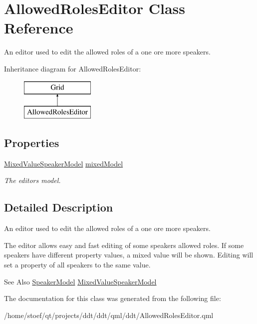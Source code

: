\hypertarget{classAllowedRolesEditor}{\section{Allowed\-Roles\-Editor Class Reference}
\label{classAllowedRolesEditor}
}


An editor used to edit the allowed roles of a one ore more speakers.  


Inheritance diagram for Allowed\-Roles\-Editor\-:\begin{figure}[H]
\begin{center}
\leavevmode
\includegraphics[height=2.000000cm]{classAllowedRolesEditor}
\end{center}
\end{figure}
\subsection*{Properties}
\begin{DoxyCompactItemize}
\item 
\hypertarget{classAllowedRolesEditor_a86e4e22c541f8fefd3a72d7b0b281749}{\hyperlink{classMixedValueSpeakerModel}{Mixed\-Value\-Speaker\-Model} \hyperlink{classAllowedRolesEditor_a86e4e22c541f8fefd3a72d7b0b281749}{mixed\-Model}}\label{classAllowedRolesEditor_a86e4e22c541f8fefd3a72d7b0b281749}

\begin{DoxyCompactList}\small\item\em The editors model. \end{DoxyCompactList}\end{DoxyCompactItemize}


\subsection{Detailed Description}
An editor used to edit the allowed roles of a one ore more speakers. 

The editor allows easy and fast editing of some speakers allowed roles. If some speakers have different property values, a mixed value will be shown. Editing will set a property of all speakers to the same value. \begin{DoxySeeAlso}{See Also}
\hyperlink{classSpeakerModel}{Speaker\-Model} \hyperlink{classMixedValueSpeakerModel}{Mixed\-Value\-Speaker\-Model} 
\end{DoxySeeAlso}


The documentation for this class was generated from the following file\-:\begin{DoxyCompactItemize}
\item 
/home/stoef/qt/projects/ddt/ddt/qml/ddt/Allowed\-Roles\-Editor.\-qml\end{DoxyCompactItemize}
